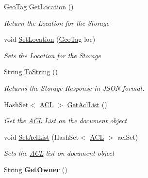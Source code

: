 \begin{DoxyCompactItemize}
\hyperlink{classcom_1_1shephertz_1_1app42_1_1paas_1_1sdk_1_1csharp_1_1storage_1_1_geo_tag}{Geo\+Tag} \hyperlink{classcom_1_1shephertz_1_1app42_1_1paas_1_1sdk_1_1csharp_1_1user_1_1_user_1_1_j_s_o_n_document_afc4a6db24511edee078a776d20ec9121}{Get\+Location} ()
\begin{DoxyCompactList}\small\item\em Return the Location for the Storage \end{DoxyCompactList}\item 
void \hyperlink{classcom_1_1shephertz_1_1app42_1_1paas_1_1sdk_1_1csharp_1_1user_1_1_user_1_1_j_s_o_n_document_aa3e58b7dcf6bbf2705a9e2a63c97e1ba}{Set\+Location} (\hyperlink{classcom_1_1shephertz_1_1app42_1_1paas_1_1sdk_1_1csharp_1_1storage_1_1_geo_tag}{Geo\+Tag} loc)
\begin{DoxyCompactList}\small\item\em Sets the Location for the Storage \end{DoxyCompactList}\item 
String \hyperlink{classcom_1_1shephertz_1_1app42_1_1paas_1_1sdk_1_1csharp_1_1user_1_1_user_1_1_j_s_o_n_document_aceb3706490afe897935595afb6a95aa7}{To\+String} ()
\begin{DoxyCompactList}\small\item\em Returns the Storage Response in J\+S\+O\+N format. \end{DoxyCompactList}\item 
Hash\+Set$<$ \hyperlink{classcom_1_1shephertz_1_1app42_1_1paas_1_1sdk_1_1csharp_1_1_a_c_l}{A\+C\+L} $>$ \hyperlink{classcom_1_1shephertz_1_1app42_1_1paas_1_1sdk_1_1csharp_1_1user_1_1_user_1_1_j_s_o_n_document_a61032fbca1b3379d30fd703d7c5af557}{Get\+Acl\+List} ()
\begin{DoxyCompactList}\small\item\em Get the \hyperlink{classcom_1_1shephertz_1_1app42_1_1paas_1_1sdk_1_1csharp_1_1_a_c_l}{A\+C\+L} List on the document object \end{DoxyCompactList}\item 
void \hyperlink{classcom_1_1shephertz_1_1app42_1_1paas_1_1sdk_1_1csharp_1_1user_1_1_user_1_1_j_s_o_n_document_abd1e8272cb55a75c37e720b2c3fc1e16}{Set\+Acl\+List} (Hash\+Set$<$ \hyperlink{classcom_1_1shephertz_1_1app42_1_1paas_1_1sdk_1_1csharp_1_1_a_c_l}{A\+C\+L} $>$ acl\+Set)
\begin{DoxyCompactList}\small\item\em Sets the \hyperlink{classcom_1_1shephertz_1_1app42_1_1paas_1_1sdk_1_1csharp_1_1_a_c_l}{A\+C\+L} list on document object \end{DoxyCompactList}\item 
\hypertarget{classcom_1_1shephertz_1_1app42_1_1paas_1_1sdk_1_1csharp_1_1user_1_1_user_1_1_j_s_o_n_document_a65fbd628f0634c48c6b1935d8713b202}{String {\bfseries Get\+Owner} ()}\label{classcom_1_1shephertz_1_1app42_1_1paas_1_1sdk_1_1csharp_1_1user_1_1_user_1_1_j_s_o_n_document_a65fbd628f0634c48c6b1935d8713b202}


\end{DoxyCompactItemize}
